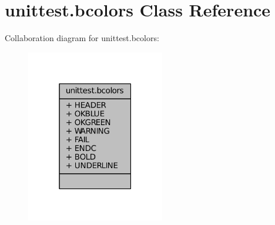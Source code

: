 \hypertarget{classunittest_1_1bcolors}{}\section{unittest.\+bcolors Class Reference}
\label{classunittest_1_1bcolors}


Collaboration diagram for unittest.\+bcolors\+:
\nopagebreak
\begin{figure}[H]
\begin{center}
\leavevmode
\includegraphics[width=171pt]{classunittest_1_1bcolors__coll__graph}
\end{center}
\end{figure}
